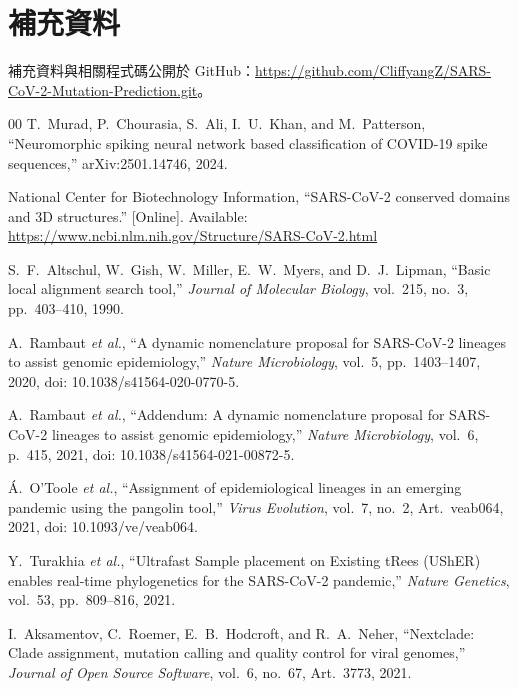 \documentclass[10pt,a4paper]{article}
\begin{document}
\section*{補充資料}

補充資料與相關程式碼公開於 GitHub：\url{https://github.com/CliffyangZ/SARS-CoV-2-Mutation-Prediction.git}。

\FloatBarrier
\begingroup\footnotesize\setlength{\itemsep}{0pt}\setlength{\parsep}{0pt}\begin{thebibliography}{00}
T.~Murad, P.~Chourasia, S.~Ali, I.~U.~Khan, and M.~Patterson,
``Neuromorphic spiking neural network based classification of COVID-19 spike sequences,''
arXiv:2501.14746, 2024.

National Center for Biotechnology Information,
``SARS-CoV-2 conserved domains and 3D structures.''
[Online]. Available: \url{https://www.ncbi.nlm.nih.gov/Structure/SARS-CoV-2.html}

S.~F.~Altschul, W.~Gish, W.~Miller, E.~W.~Myers, and D.~J.~Lipman,
``Basic local alignment search tool,''
\textit{Journal of Molecular Biology}, vol.~215, no.~3, pp.~403--410, 1990.

A.~Rambaut \textit{et al.},
``A dynamic nomenclature proposal for SARS-CoV-2 lineages to assist genomic epidemiology,''
\textit{Nature Microbiology}, vol.~5, pp.~1403--1407, 2020,
doi: 10.1038/s41564-020-0770-5.

A.~Rambaut \textit{et al.},
``Addendum: A dynamic nomenclature proposal for SARS-CoV-2 lineages to assist genomic epidemiology,''
\textit{Nature Microbiology}, vol.~6, p.~415, 2021,
doi: 10.1038/s41564-021-00872-5.

\'{A}.~O'Toole \textit{et al.},
``Assignment of epidemiological lineages in an emerging pandemic using the pangolin tool,''
\textit{Virus Evolution}, vol.~7, no.~2, Art.~veab064, 2021,
doi: 10.1093/ve/veab064.

Y.~Turakhia \textit{et al.},
``Ultrafast Sample placement on Existing tRees (UShER) enables real-time phylogenetics for the SARS-CoV-2 pandemic,''
\textit{Nature Genetics}, vol.~53, pp.~809--816, 2021.

I.~Aksamentov, C.~Roemer, E.~B.~Hodcroft, and R.~A.~Neher,
``Nextclade: Clade assignment, mutation calling and quality control for viral genomes,''
\textit{Journal of Open Source Software}, vol.~6, no.~67, Art.~3773, 2021.


\end{thebibliography}
\end{document}

